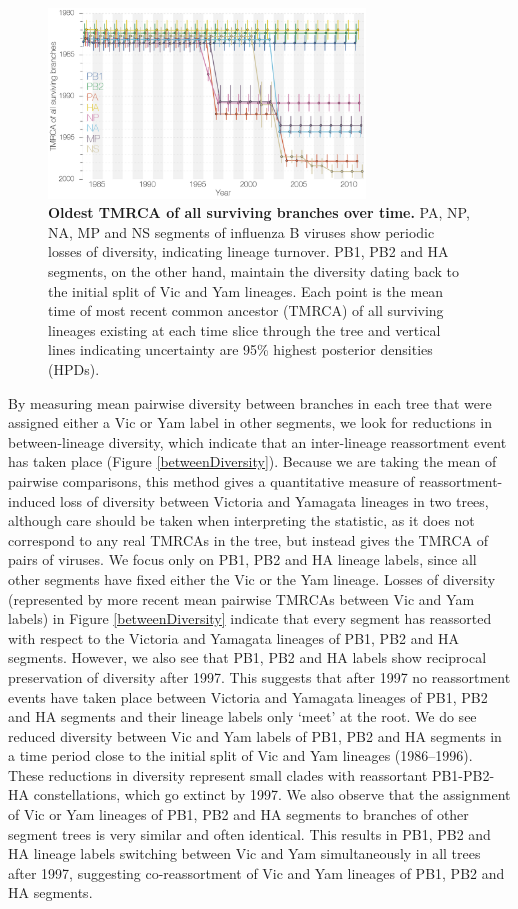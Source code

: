 \documentclass[11pt,oneside,letterpaper]{article}
\begin{document}
\begin{figure}[h]
	\centering		
	\includegraphics[width=0.75\textwidth]{figures/InfB_tmrcaOT_lines.png}
	\caption{\textbf{Oldest TMRCA of all surviving branches over time.}
PA, NP, NA, MP and NS segments of influenza B viruses show periodic losses of diversity, indicating lineage turnover.
PB1, PB2 and HA segments, on the other hand, maintain the diversity dating back to the initial split of Vic and Yam lineages.
Each point is the mean time of most recent common ancestor (TMRCA) of all surviving lineages existing at each time slice through the tree and vertical lines indicating uncertainty are 95\% highest posterior densities (HPDs).}
	\label{tmrcaOT}
\end{figure}

By measuring mean pairwise diversity between branches in each tree that were assigned either a Vic or Yam label in other segments, we look for reductions in between-lineage diversity, which indicate that an inter-lineage reassortment event has taken place (Figure \ref{betweenDiversity}).
Because we are taking the mean of pairwise comparisons, this method gives a quantitative measure of reassortment-induced loss of diversity between Victoria and Yamagata lineages in two trees, although care should be taken when interpreting the statistic, as it does not correspond to any real TMRCAs in the tree, but instead gives the TMRCA of pairs of viruses.
We focus only on PB1, PB2 and HA lineage labels, since all other segments have fixed either the Vic or the Yam lineage.
Losses of diversity (represented by more recent mean pairwise TMRCAs between Vic and Yam labels) in Figure \ref{betweenDiversity} indicate that every segment has reassorted with respect to the Victoria and Yamagata lineages of PB1, PB2 and HA segments.
However, we also see that PB1, PB2 and HA labels show reciprocal preservation of diversity after 1997.
This suggests that after 1997 no reassortment events have taken place between Victoria and Yamagata lineages of PB1, PB2 and HA segments and their lineage labels only `meet' at the root.
We do see reduced diversity between Vic and Yam labels of PB1, PB2 and HA segments in a time period close to the initial split of Vic and Yam lineages (1986--1996).
These reductions in diversity represent small clades with reassortant PB1-PB2-HA constellations, which go extinct by 1997.
We also observe that the assignment of Vic or Yam lineages of PB1, PB2 and HA segments to branches of other segment trees is very similar and often identical.
This results in PB1, PB2 and HA lineage labels switching between Vic and Yam simultaneously in all trees after 1997, suggesting co-reassortment of Vic and Yam lineages of PB1, PB2 and HA segments. 
\end{document}

